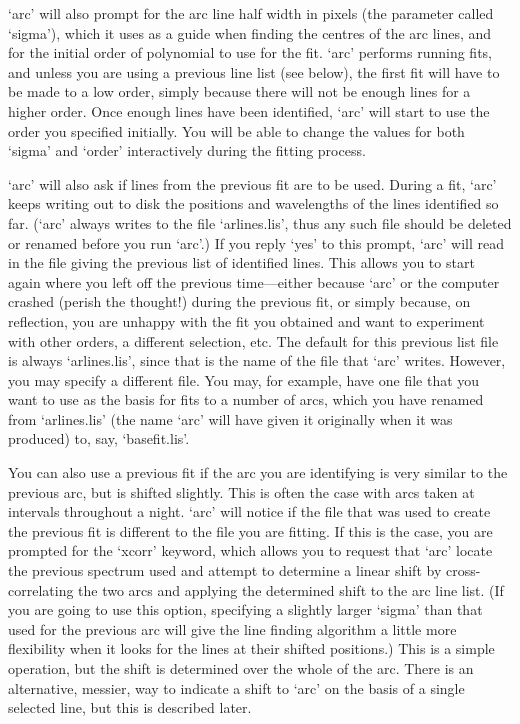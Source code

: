 \documentclass[11pt,twoside]{article}
\newcommand{\latorhtm}[2]{#1}
\newcommand{\latorhtm}[2]{#2}
\begin{document}
   `arc' will also prompt for the arc line half width in pixels (the
   parameter called `sigma'), which it uses as a guide when finding the
   centres of the arc lines, and for the initial order of polynomial to
   use for the fit. `arc' performs running fits, and unless you are
   using a previous line list (see below), the first fit will have to be
   made to a low order, simply because there will not be enough lines
   for a higher order.  Once enough lines have been identified, `arc'
   will start to use the order you specified initially.  You will be
   able to change the values for both `sigma' and `order' interactively
   during the fitting process.

   `arc' will also ask if lines from the previous fit are to be used.
   During a fit, `arc' keeps writing out to disk the positions and
   wavelengths of the lines identified so far. (`arc' always writes to
   the file `arlines.lis', thus any such file should be deleted or
   renamed before you run `arc'.)  If you reply `yes' to this prompt,
   `arc' will read in the file giving the previous list of identified
   lines.  This allows you to start again where you left off the
   previous time\latorhtm{---}{-}either because `arc' or the computer
   crashed (perish
   the thought!) during the previous fit, or simply because, on
   reflection, you are unhappy with the fit you obtained and want to
   experiment with other orders, a different selection, etc.  The
   default for this previous list file is always `arlines.lis', since
   that is the name of the file that `arc' writes.  However, you may
   specify a different file.  You may, for example, have one file that
   you want to use as the basis for fits to a number of arcs, which you
   have renamed from `arlines.lis' (the name `arc' will have given it
   originally when it was produced) to, say, `basefit.lis'.

   You can also use a previous fit if the arc you are identifying is
   very similar to the previous arc, but is shifted slightly. This is
   often the case with arcs taken at intervals throughout a night. `arc'
   will notice if the file that was used to create the previous fit is
   different to the file you are fitting.  If this is the case, you are
   prompted for the `xcorr' keyword, which allows you to request that
   `arc' locate the previous spectrum used and attempt to determine a
   linear shift by cross-correlating the two arcs and applying the
   determined shift to the arc line list.  (If you are going to use this
   option, specifying a slightly larger `sigma' than that used for the
   previous arc will give the line finding algorithm a little more
   flexibility when it looks for the lines at their shifted positions.)
   This is a simple operation, but the shift is determined over the
   whole of the arc.  There is an alternative, messier, way to indicate
   a shift to `arc' on the basis of a single selected line, but this is
   described later.
\end{document}
